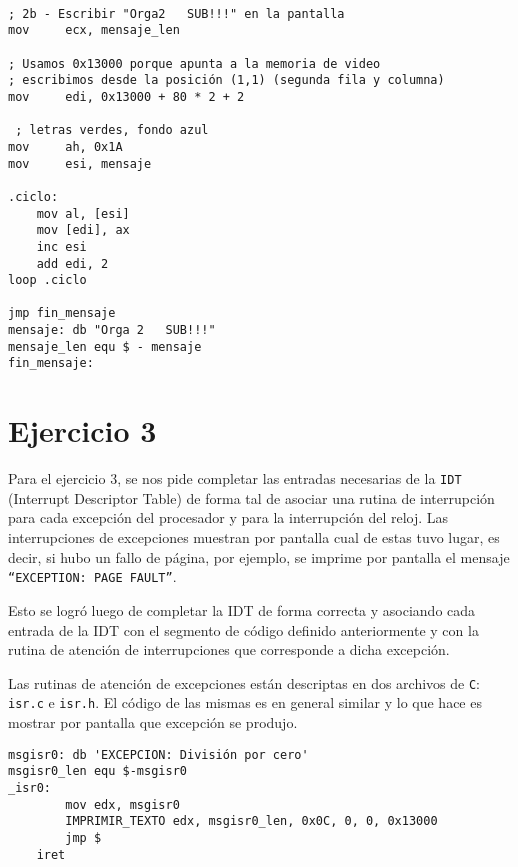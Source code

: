 \begin{verbatim}

; 2b - Escribir "Orga2   SUB!!!" en la pantalla
mov     ecx, mensaje_len

; Usamos 0x13000 porque apunta a la memoria de video
; escribimos desde la posición (1,1) (segunda fila y columna)
mov     edi, 0x13000 + 80 * 2 + 2   

 ; letras verdes, fondo azul
mov     ah, 0x1A
mov     esi, mensaje

.ciclo:
	mov al, [esi]
	mov [edi], ax
	inc esi
	add edi, 2
loop .ciclo

jmp fin_mensaje
mensaje: db "Orga 2   SUB!!!"
mensaje_len equ $ - mensaje
fin_mensaje:

\end{verbatim}


\section{Ejercicio 3}

Para el ejercicio 3, se nos pide completar las entradas necesarias de la \texttt{IDT} (Interrupt Descriptor Table) de forma tal de asociar una rutina de interrupción para cada excepción del procesador y para la interrupción del reloj. Las interrupciones de excepciones muestran por pantalla cual de estas tuvo lugar, es decir, si hubo un fallo de página, por ejemplo, se imprime por pantalla el mensaje \texttt{``EXCEPTION: PAGE FAULT''}.

Esto se logró luego de completar la IDT de forma correcta y asociando cada entrada de la IDT con el segmento de código definido anteriormente y con la rutina de atención de interrupciones que corresponde a dicha excepción. %

Las rutinas de atención de excepciones están descriptas en dos archivos de \texttt{C}: \texttt{isr.c} e \texttt{isr.h}. El código de las mismas es en general similar y lo que hace es mostrar por pantalla que excepción se produjo. 

\begin{verbatim}
msgisr0: db 'EXCEPCION: División por cero'
msgisr0_len equ $-msgisr0
_isr0:
        mov edx, msgisr0
        IMPRIMIR_TEXTO edx, msgisr0_len, 0x0C, 0, 0, 0x13000
        jmp $
    iret

\end{verbatim}

